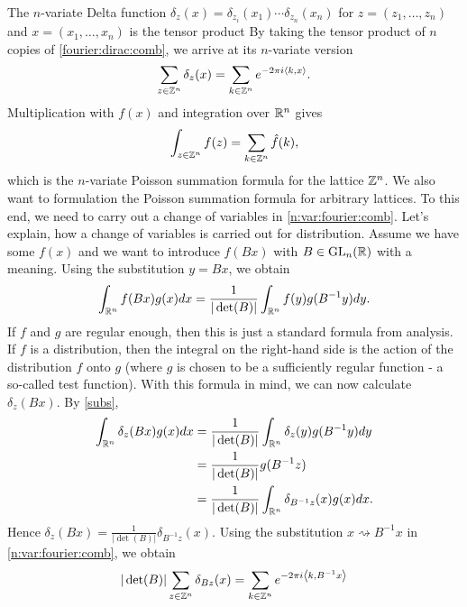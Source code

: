 The $n$-variate Delta function $\delta_z(x) = \delta_{z_i} (x_1) \cdots \delta_{z_n}(x_n)$ for $z = (z_1,\ldots,z_n)$ and $x = (x_1,\ldots,x_n)$ is the tensor product By taking the tensor product of $n$ copies of \eqref{fourier:dirac:comb}, we arrive at its $n$-variate version 
\begin{equation} 
	\label{n:var:fourier:comb} 
	\sum_{z \in \mathbb{Z}^n} \delta_z(x)  = \sum_{k \in \mathbb{Z}^n} e^{ - 2 \pi i \left\langle k , x \right\rangle}. 
\end{equation}
Multiplication with $f(x)$ and integration over $\mathbb{R}^n$ gives 
\begin{equation} 
		\label{n:var:poisson:summation} 
	\int_{z  \in \mathbb{Z}^n} f(z) = \sum_{k \in \mathbb{Z}^n} \hat{f} (k), 
\end{equation} 
which is the $n$-variate Poisson summation formula for the lattice $\mathbb{Z}^n$. 
We also want to formulation the Poisson summation formula for arbitrary lattices. To this end, we need to carry out a change of variables in \eqref{n:var:fourier:comb}. Let's explain, how a change of variables is carried out for distribution. Assume we have some $f(x)$ and we want to introduce $f( B x)$ with $B \in \operatorname{GL}_n(\mathbb{R})$ with a meaning. Using the substitution $y = Bx$, we obtain  
\begin{equation} \label{subs} 
	\int_{\mathbb{R}^n} f(B x) g(x) d x  = \frac{1}{|\det(B) | } \int_{\mathbb{R}^n} f(y) g(B^{-1} y) d y. 
\end{equation} 
If $f$ and $g$ are regular enough, then this is just a standard formula from analysis. If $f$ is a distribution, then the integral on the right-hand side is the action of the distribution $f$ onto $g$ (where $g$ is chosen to be a sufficiently regular function - a so-called test function). 
With this formula in mind, we can now calculate $\delta_z(B x)$. By \eqref{subs}, 
\begin{align*} 
	\int_{\mathbb{R}^n} \delta_z(B x) g(x) d x  & = \frac{1}{|\det(B)|} \int_{\mathbb{R}^n} \delta_z(y) g(B^{-1} y) d y \\ & = \frac{1}{|\det(B)|} g(B^{-1} z) \\ & =  \frac{1}{| \det(B)|} \int_{\mathbb{R}^n} \delta_{B^{-1} z}(x) g(x) d x. 
\end{align*} 
Hence $\delta_z(B x) = \frac{1}{|\det(B)|} \delta_{B^{-1} z} (x)$. Using the substitution $x \rightsquigarrow B^{-1} x$ in \eqref{n:var:fourier:comb}, we obtain 
\begin{equation} \label{aux:poisson} 
	| \det(B) | \sum_{z \in \mathbb{Z}^n} \delta_{B z}(x) = \sum_{k \in \mathbb{Z}^n} e^{ - 2 \pi i \left\langle k , B^{-1} x \right\rangle} 
\end{equation} 
